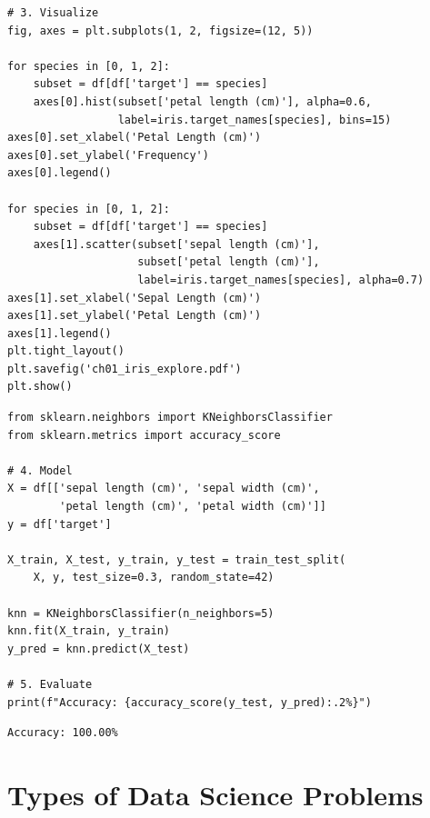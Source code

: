 \begin{codeblock}[title=\textbf{Python --- Visualization}]
\begin{verbatim}
# 3. Visualize
fig, axes = plt.subplots(1, 2, figsize=(12, 5))

for species in [0, 1, 2]:
    subset = df[df['target'] == species]
    axes[0].hist(subset['petal length (cm)'], alpha=0.6,
                 label=iris.target_names[species], bins=15)
axes[0].set_xlabel('Petal Length (cm)')
axes[0].set_ylabel('Frequency')
axes[0].legend()

for species in [0, 1, 2]:
    subset = df[df['target'] == species]
    axes[1].scatter(subset['sepal length (cm)'],
                    subset['petal length (cm)'],
                    label=iris.target_names[species], alpha=0.7)
axes[1].set_xlabel('Sepal Length (cm)')
axes[1].set_ylabel('Petal Length (cm)')
axes[1].legend()
plt.tight_layout()
plt.savefig('ch01_iris_explore.pdf')
plt.show()
\end{verbatim}
\end{codeblock}

\begin{codeblock}[title=\textbf{Python --- Simple modeling}]
\begin{verbatim}
from sklearn.neighbors import KNeighborsClassifier
from sklearn.metrics import accuracy_score

# 4. Model
X = df[['sepal length (cm)', 'sepal width (cm)',
        'petal length (cm)', 'petal width (cm)']]
y = df['target']

X_train, X_test, y_train, y_test = train_test_split(
    X, y, test_size=0.3, random_state=42)

knn = KNeighborsClassifier(n_neighbors=5)
knn.fit(X_train, y_train)
y_pred = knn.predict(X_test)

# 5. Evaluate
print(f"Accuracy: {accuracy_score(y_test, y_pred):.2%}")
\end{verbatim}
\end{codeblock}

\begin{codeoutput}
\begin{verbatim}
Accuracy: 100.00%
\end{verbatim}
\end{codeoutput}

\section{Types of Data Science Problems}

